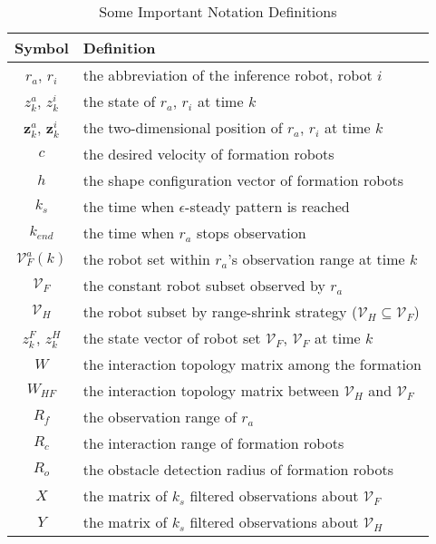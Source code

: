 \documentclass[12pt,journal,draftclsnofoot,onecolumn]{IEEEtran}
\let \sss=\scriptscriptstyle
\begin{document}
\begin{table}[t]
\small
\centering
 \caption{\label{tab:test}Some Important Notation Definitions} 
 \begin{tabular}{cl}
 \toprule 
  Symbol  & Definition  \\ 
  \midrule
  $r_a$, $r_i$ & the abbreviation of the inference robot, robot $i$\\
  $z^a_k$, $z^i_k$ & the state of $r_a$, $r_i$ at time $k$\\
  ${\mathbf z}_k^{a}$, ${\mathbf z}_k^{i}$ & the two-dimensional position of $r_a$, $r_i$ at time $k$ \\
  $c$ & the desired velocity of formation robots\\
  $h$ & the shape configuration vector of formation robots\\
  $k_s$ & the time when $\epsilon$-steady pattern is reached\\
  $k_{end}$ & the time when $r_a$ stops observation\\
  $\mathcal{V}_{\sss F}^{a}(k)$ & the robot set within $r_a$'s observation range at time $k$ \\  
  $\mathcal{V}_{\sss F}$ & the constant robot subset observed by $r_a$\\  
  $\mathcal{V}_{\sss H}$ & the robot subset by range-shrink strategy ($\mathcal{V}_{\sss H}\subseteq\mathcal{V}_{\sss F}$)\\ 
  $z^{\sss F}_k$, $z^{\sss H}_k$ & the state vector of robot set $\mathcal{V}_{\sss F}$, $\mathcal{V}_{\sss F}$ at time $k$\\
  $W$ & the interaction topology matrix among the formation\\
  $W_{\sss HF}$ & the interaction topology matrix between $\mathcal{V}_{\sss H}$ and $\mathcal{V}_{\sss F}$\\
  $R_f$ & the observation range of $r_a$\\
  $R_c$ & the interaction range of formation robots\\
  $R_o$ & the obstacle detection radius of formation robots\\
  $X$ & the matrix of $k_s$ filtered observations about $\mathcal{V}_{\sss F}$\\ 
  $Y$ & the matrix of $k_s$ filtered observations about $\mathcal{V}_{\sss H}$\\ 
  \bottomrule 
 \end{tabular} 
\end{table}
\end{document}

